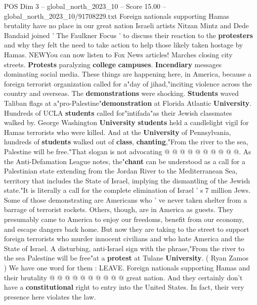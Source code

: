 \begin{textsample}{POS Dim 3 – global\_north\_2023\_10 – Score 15.00 – global\_north\_2023\_10/91708229.txt}  \label{ex:f3_pos_269}
Foreign nationals supporting Hamas brutality have no place in our great nation Israeli artists Nitzan Mintz and Dede Bandaid joined ' The Faulkner Focus ' to discuss their reaction to the \textbf{protesters} and why they felt the need to take action to help those likely taken hostage by Hamas.
NEWYou can now listen to Fox News articles!
Marches closing city streets. \textbf{Protests} paralyzing \textbf{college} \textbf{campuses}. \textbf{Incendiary} messages dominating social media.
These things are happening here, in America, because a foreign terrorist organization called for a"day of jihad,"inciting violence across the country and overseas.
The \textbf{demonstrations} were shocking. \textbf{Students} waved Taliban flags at a"pro-Palestine"\textbf{demonstration} at Florida Atlantic \textbf{University}.
Hundreds of UCLA \textbf{students} called for"intifada"as their Jewish classmates walked by.
George Washington \textbf{University} \textbf{students} held a candlelight vigil for Hamas terrorists who were killed.
And at the \textbf{University} of Pennsylvania, hundreds of \textbf{students} walked out of \textbf{class}, \textbf{chanting},"From the river to the sea, Palestine will be free."That slogan is not advocating @ @ @ @ @ @ @ @ @ @.
As the Anti-Defamation League notes, the"\textbf{chant} can be understood as a call for a Palestinian state extending from the Jordan River to the Mediterranean Sea, territory that includes the State of Israel, implying the dismantling of the Jewish state."It is literally a call for the complete elimination of Israel ' s 7 million Jews.
Some of those demonstrating are Americans who ' ve never taken shelter from a barrage of terrorist rockets.
Others, though, are in America as guests.
They presumably came to America to enjoy our freedoms, benefit from our economy, and escape dangers back home.
But now they are taking to the street to support foreign terrorists who murder innocent civilians and who hate America and the State of Israel.
A disturbing, anti-Israel sign with the phrase,"From the river to the sea Palestine will be free"at a \textbf{protest} at Tulane \textbf{University}. ( Ryan Zamos ) We have one word for them : LEAVE.
Foreign nationals supporting Hamas and their brutality @ @ @ @ @ @ @ @ @ @ great nation.
And they certainly don't have a \textbf{constitutional} right to entry into the United States.
In fact, their very presence here violates the law.

\end{textsample}

